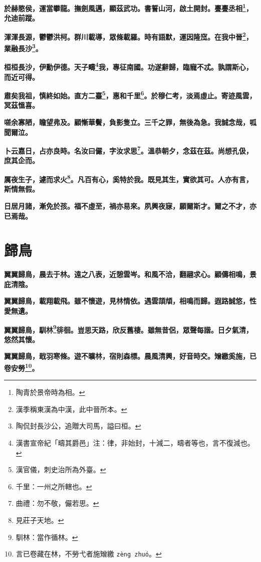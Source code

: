 \textbf{於赫愍侯，運當攀龍。撫劍風邁，顯茲武功。書誓山河，啟土開封。亹亹丞相\footnote{陶青於景帝時為相。}，允迪前蹤。}

\textbf{渾渾長源，鬱鬱洪柯。群川載導，眾條載羅。時有語默，運因隆窊。在我中晉\footnote{漢季稱東漢為中漢，此中晉所本。}，業融長沙\footnote{陶侃封長沙公，追贈大司馬，謚曰桓。}。}

\textbf{桓桓長沙，伊勳伊德。天子疇\footnote{漢書宣帝紀「疇其爵邑」注：律，非始封，十減二，疇者等也，言不復減也。}我，專征南國。功遂辭歸，臨寵不忒。孰謂斯心，而近可得。}

\textbf{肅矣我祖，慎終如始。直方二臺\footnote{漢官儀，刺史治所為外臺。}，惠和千里\footnote{千里：一州之所轄也。}。於穆仁考，淡焉虛止。寄迹風雲，冥茲慍喜。}

\textbf{嗟余寡陋，瞻望弗及。顧慚華鬢，負影隻立。三千之罪，無後為急。我誠念哉，呱聞爾泣。}

\textbf{卜云嘉日，占亦良時。名汝曰儼，字汝求思\footnote{曲禮：勿不敬，儼若思。}。溫恭朝夕，念茲在茲。尚想孔伋，庶其企而。}

\textbf{厲夜生子，遽而求火\footnote{見莊子天地。}。凡百有心，奚特於我。既見其生，實欲其可。人亦有言，斯情無假。}

\textbf{日居月諸，漸免於孩。福不虛至，禍亦易來。夙興夜寐，願爾斯才。爾之不才，亦已焉哉。}

\section{歸鳥}

\textbf{翼翼歸鳥，晨去于林。遠之八表，近憩雲岑。和風不洽，翻翮求心。顧儔相鳴，景庇清陰。}

\textbf{翼翼歸鳥，載翔載飛。雖不懷遊，見林情依。遇雲頡頏，相鳴而歸。遐路誠悠，性愛無遺。}

\textbf{翼翼歸鳥，馴林\footnote{馴林：當作循林。}徘徊。豈思天路，欣反舊棲。雖無昔侶，眾聲每諧。日夕氣清，悠然其懷。}

\textbf{翼翼歸鳥，戢羽寒條。遊不曠林，宿則森標。晨風清興，好音時交。矰繳奚施，已卷安勞\footnote{言已卷藏在林，不勞弋者施矰繳 \texttt{zèng zhuó}。}。}

